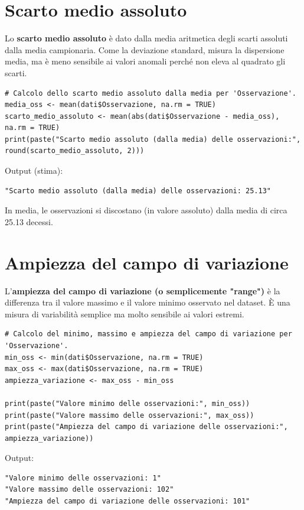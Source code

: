 \documentclass[14pt, openany, titlepage]{report} %
\begin{document}
\section{Scarto medio assoluto}
Lo \textbf{scarto medio assoluto}
è dato dalla media aritmetica degli scarti assoluti dalla media campionaria.
 Come la deviazione standard, 
  misura la dispersione media, ma è meno sensibile ai valori 
  anomali perché non eleva al quadrato gli scarti.
\begin{center}
\begin{lstlisting}[breaklines=true]
# Calcolo dello scarto medio assoluto dalla media per 'Osservazione'.
media_oss <- mean(dati$Osservazione, na.rm = TRUE)
scarto_medio_assoluto <- mean(abs(dati$Osservazione - media_oss), na.rm = TRUE)
print(paste("Scarto medio assoluto (dalla media) delle osservazioni:", round(scarto_medio_assoluto, 2)))
\end{lstlisting}
\end{center}
\noindent
Output (stima):
\begin{verbatim}
"Scarto medio assoluto (dalla media) delle osservazioni: 25.13"
\end{verbatim}
In media, le osservazioni si discostano (in valore assoluto) 
dalla media di circa 25.13 decessi.

\section{Ampiezza del campo di variazione}
L'\textbf{ampiezza del campo di variazione (o semplicemente "range")} 
è la differenza tra il valore massimo e il valore minimo osservato 
nel dataset. È una misura di variabilità semplice ma molto sensibile 
ai valori estremi.
\newpage
\begin{center}
\begin{lstlisting}[breaklines=true]
# Calcolo del minimo, massimo e ampiezza del campo di variazione per 'Osservazione'.
min_oss <- min(dati$Osservazione, na.rm = TRUE)
max_oss <- max(dati$Osservazione, na.rm = TRUE)
ampiezza_variazione <- max_oss - min_oss 

print(paste("Valore minimo delle osservazioni:", min_oss))
print(paste("Valore massimo delle osservazioni:", max_oss))
print(paste("Ampiezza del campo di variazione delle osservazioni:", ampiezza_variazione))
\end{lstlisting}
\end{center}
\noindent
Output:
\begin{verbatim}
"Valore minimo delle osservazioni: 1" 
"Valore massimo delle osservazioni: 102" 
"Ampiezza del campo di variazione delle osservazioni: 101"
\end{verbatim}
\end{document}
